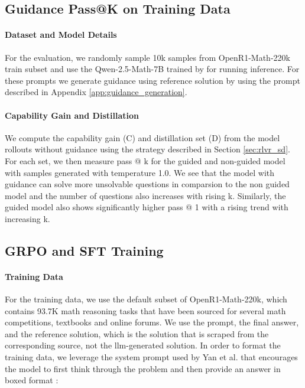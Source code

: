 \documentclass{article}
\begin{document}
{\subsection{Guidance Pass@K on Training Data} 

\paragraph{Dataset and Model Details} For the evaluation, we randomly sample 10k samples from OpenR1-Math-220k \cite{openr1} train subset and use the Qwen-2.5-Math-7B trained by \cite{yan2025luffy} for running inference. For these prompts we generate guidance using reference solution by using the prompt described in Appendix \ref{app:guidance_generation}. 

\paragraph{Capability Gain and Distillation} We compute the capability gain (C) and distillation set (D) from the model rollouts without guidance using the strategy described in Section \ref{sec:rlvr_sd}. For each set, we then measure pass @ k for the guided and non-guided model with samples generated with temperature 1.0. We see that the model with guidance can solve more unsolvable questions in comparsion to the non guided model and the number of questions also increases with rising k. Similarly, the guided model also shows significantly higher pass @ 1 with a rising trend with increasing k.



\subsection{GRPO and SFT Training}

\paragraph{Training Data} For the training data, we use the default subset of OpenR1-Math-220k, which contains 93.7K math reasoning tasks that have been sourced for several math competitions, textbooks and online forums. We use the prompt, the final answer, and the reference solution, which is the solution that is scraped from the corresponding source, not the llm-generated solution. In order to format the training data, we leverage the system prompt used by Yan et al. that encourages the model to first think through the problem and then provide an answer in boxed format \cite{yan2025luffy}:

}
\end{document}
